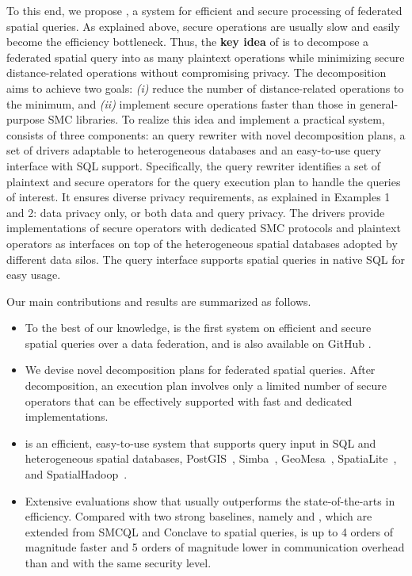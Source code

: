 To this end, we propose \sysname \cite{fullpaper}, a system for efficient and secure processing of federated spatial queries.
As explained above, secure operations are usually slow and easily become the efficiency bottleneck.
Thus, the \textbf{key idea} of \sysname is to decompose a federated spatial query into as many plaintext operations while minimizing secure distance-related operations without compromising privacy.
The decomposition aims to achieve two goals: \textit{(i)} reduce the number of distance-related operations to the minimum, and \textit{(ii)} implement secure operations faster than those in general-purpose SMC libraries.
To realize this idea and implement a practical system, \sysname consists of three components: an query rewriter with novel decomposition plans, a set of drivers adaptable to heterogeneous databases and an easy-to-use query interface with SQL support.
Specifically, the query rewriter identifies a set of plaintext and secure operators for the query execution plan to handle the queries of interest. It ensures diverse privacy requirements, as explained in Examples 1 and 2: data privacy only, or both data and query privacy. 
The drivers provide implementations of secure operators with dedicated SMC protocols and plaintext operators as interfaces on top of the heterogeneous spatial databases adopted by different data silos. The query interface supports spatial queries in native SQL for easy usage.

Our main contributions and results are summarized as follows.
\begin{itemize}%
	\item 
	To the best of our knowledge, \sysname is the first system on efficient and secure spatial queries over a data federation, and is also available on GitHub \cite{fullpaper}.
    \item 
    We devise novel decomposition plans for federated spatial queries. 
    After decomposition, an execution plan involves only a limited number of secure operators that can be effectively supported with fast and dedicated implementations.
    \item 
    \sysname is an efficient, easy-to-use system that supports query input in SQL and heterogeneous spatial databases, \eg PostGIS~\cite{postgis}, Simba~\cite{sigmod16simba}, GeoMesa~\cite{ds15geomesa}, SpatiaLite~\cite{spatialite}, 
    and SpatialHadoop~\cite{icde15spatialhadoop}.
    \item 
    Extensive evaluations show that \sysname usually outperforms the state-of-the-arts \cite{vldb17smcql, eurosys19conclave} in efficiency.
	Compared with two strong baselines, namely \smcql and \conclave, which are extended from SMCQL \cite{vldb17smcql} and Conclave \cite{eurosys19conclave} to spatial queries, \sysname is up to 4 orders of magnitude faster and 5 orders of magnitude lower in communication overhead than \smcql and \conclave with the same security level.
\end{itemize}

